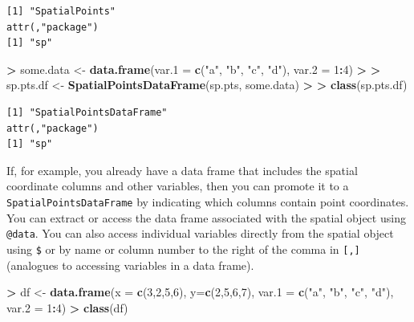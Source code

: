 \documentclass[
]{krantz}
\makeatletter
\newenvironment{Shaded}{\begin{snugshade}}{\end{snugshade}}
\newcommand{\DataTypeTok}[1]{\textcolor[rgb]{0.27,0.27,0.27}{#1}}
\newcommand{\DecValTok}[1]{\textcolor[rgb]{0.06,0.06,0.06}{#1}}
\newcommand{\ErrorTok}[1]{\textcolor[rgb]{0.14,0.14,0.14}{\textbf{#1}}}
\newcommand{\KeywordTok}[1]{\textcolor[rgb]{0.27,0.27,0.27}{\textbf{#1}}}
\newcommand{\NormalTok}[1]{#1}
\newcommand{\OperatorTok}[1]{\textcolor[rgb]{0.43,0.43,0.43}{\textbf{#1}}}
\newcommand{\StringTok}[1]{\textcolor[rgb]{0.5,0.5,0.5}{#1}}
\newenvironment{kframe}{%
\medskip{}
\setlength{\fboxsep}{.8em}
 \def\at@end@of@kframe{}%
 \ifinner\ifhmode%
  \def\at@end@of@kframe{\end{minipage}}%
  \begin{minipage}{\columnwidth}%
 \fi\fi%
 \def\FrameCommand##1{\hskip\@totalleftmargin \hskip-\fboxsep
 \colorbox{shadecolor}{##1}\hskip-\fboxsep
     \hskip-\linewidth \hskip-\@totalleftmargin \hskip\columnwidth}%
 \MakeFramed {\advance\hsize-\width
   \@totalleftmargin\z@ \linewidth\hsize
   \@setminipage}}%
 {\par\unskip\endMakeFramed%
 \at@end@of@kframe}
\renewenvironment{Shaded}{\begin{kframe}}{\end{kframe}}
\makeatother
\begin{document}
\begin{verbatim}
[1] "SpatialPoints"
attr(,"package")
[1] "sp"
\end{verbatim}

\begin{Shaded}
\begin{Highlighting}[]
\OperatorTok{\textgreater{}}\StringTok{ }\NormalTok{some.data \textless{}{-}}\StringTok{ }\KeywordTok{data.frame}\NormalTok{(}\DataTypeTok{var.1 =} \KeywordTok{c}\NormalTok{(}\StringTok{"a"}\NormalTok{, }\StringTok{"b"}\NormalTok{, }\StringTok{"c"}\NormalTok{, }\StringTok{"d"}\NormalTok{), }\DataTypeTok{var.2 =} \DecValTok{1}\OperatorTok{:}\DecValTok{4}\NormalTok{)}
\OperatorTok{\textgreater{}}\StringTok{ }
\ErrorTok{\textgreater{}}\StringTok{ }\NormalTok{sp.pts.df \textless{}{-}}\StringTok{ }\KeywordTok{SpatialPointsDataFrame}\NormalTok{(sp.pts, some.data)}
\OperatorTok{\textgreater{}}\StringTok{ }
\ErrorTok{\textgreater{}}\StringTok{ }\KeywordTok{class}\NormalTok{(sp.pts.df)}
\end{Highlighting}
\end{Shaded}

\begin{verbatim}
[1] "SpatialPointsDataFrame"
attr(,"package")
[1] "sp"
\end{verbatim}

If, for example, you already have a data frame that includes the spatial coordinate columns and other variables, then you can promote it to a \texttt{SpatialPointsDataFrame} by indicating which columns contain point coordinates. You can extract or access the data frame associated with the spatial object using \texttt{@data}. You can also access individual variables directly from the spatial object using \texttt{\$} or by name or column number to the right of the comma in \texttt{{[},{]}} (analogues to accessing variables in a data frame).

\begin{Shaded}
\begin{Highlighting}[]
\OperatorTok{\textgreater{}}\StringTok{ }\NormalTok{df \textless{}{-}}\StringTok{ }\KeywordTok{data.frame}\NormalTok{(}\DataTypeTok{x =} \KeywordTok{c}\NormalTok{(}\DecValTok{3}\NormalTok{,}\DecValTok{2}\NormalTok{,}\DecValTok{5}\NormalTok{,}\DecValTok{6}\NormalTok{), }\DataTypeTok{y=}\KeywordTok{c}\NormalTok{(}\DecValTok{2}\NormalTok{,}\DecValTok{5}\NormalTok{,}\DecValTok{6}\NormalTok{,}\DecValTok{7}\NormalTok{), }\DataTypeTok{var.1 =} \KeywordTok{c}\NormalTok{(}\StringTok{"a"}\NormalTok{, }\StringTok{"b"}\NormalTok{, }\StringTok{"c"}\NormalTok{, }\StringTok{"d"}\NormalTok{), }\DataTypeTok{var.2 =} \DecValTok{1}\OperatorTok{:}\DecValTok{4}\NormalTok{)}
\OperatorTok{\textgreater{}}\StringTok{ }\KeywordTok{class}\NormalTok{(df)}
\end{Highlighting}
\end{Shaded}
\end{document}
